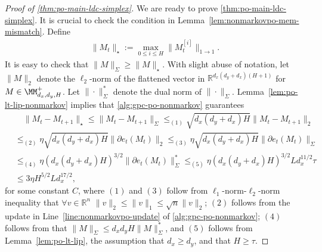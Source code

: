 \begin{proof} [Proof of \cref{thm:po-main-ldc-simplex}]
We are ready to prove \cref{thm:po-main-ldc-simplex}. It is crucial to check the condition in Lemma~\ref{lem:nonmarkovpo-mem-mismatch}. Define
\begin{align*}
\|M_t\|_{\star}:=\max_{0\le i\le H}\|M_{t}^{[i]}\|_{1\rightarrow 1}.
\end{align*}
It is easy to check that $\|M\|_{\Sigma}\ge \|M\|_{\star}$. With slight abuse of notation, let $\|M\|_2$ denote the $\ell_2$-norm of the flattened vector in $\mathbb{R}^{d_x(d_y+d_x)(H+1)}$ for $M\in\MM_{d_x,d_y,H}^{+}$. Let $\|\cdot\|_{\Sigma}^*$ denote the dual norm of $\|\cdot\|_{\Sigma}$. Lemma~\ref{lem:po-lt-lip-nonmarkov} implies that
\cref{alg:gpc-po-nonmarkov} guarantees
\begin{align*}
& \quad \|M_{t}-M_{t+1}\|_{\star}\le\|M_{t}-M_{t+1}\|_{\Sigma}\le_{(1)} \sqrt{d_x(d_y+d_x)H}\|M_{t}-M_{t+1}\|_2\\
&\le_{(2)} \eta \sqrt{d_x(d_y+d_x)H} \|\partial e_t(M_t)\|_{2}\le_{(3)}\eta \sqrt{d_x(d_y+d_x)H}\|\partial e_t(M_t)\|_{\Sigma}\\
&\le_{(4)} \eta (d_x(d_y+d_x)H)^{3/2} \|\partial e_t(M_t)\|_{\Sigma}^{*}\le_{(5)} \eta(d_x(d_y+d_x)H)^{3/2}Ld_x^{11/2}\tau\\
&\le 3\eta H^{5/2}Ld_x^{17/2}, 
\end{align*}
for some constant $C$, where $(1)$ and $(3)$ follow from $\ell_1$-norm-$\ell_2$-norm inequality that $\forall v\in\mathbb{R}^n$ $\|v\|_2\le \|v\|_1\le\sqrt{n}\|v\|_2$; $(2)$ follows from the update in Line~\ref{line:nonmarkovpo-update} of \cref{alg:gpc-po-nonmarkov};
$(4)$ follows from that $\|M\|_{\Sigma}\le d_xd_yH\|M\|_{\Sigma}^*$, and $(5)$ follows from Lemma~\ref{lem:po-lt-lip}, the assumption that $d_x\ge d_y$, and that $H\ge \tau$. 


\end{proof}
